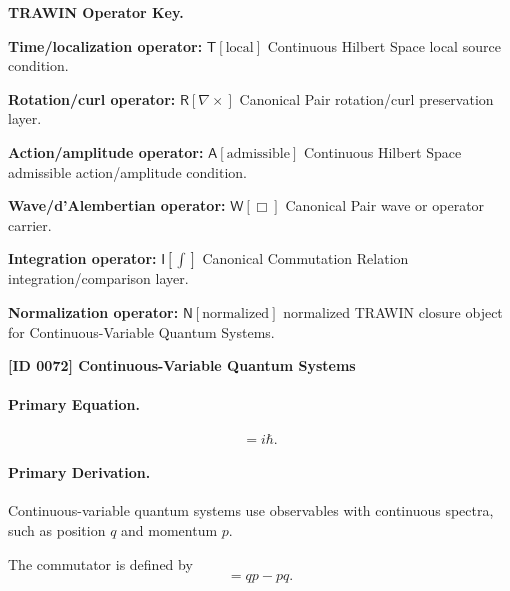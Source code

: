 \par\vspace{0.45\baselineskip}
\noindent\begin{minipage}[t]{\linewidth}
\begingroup
\small
\raggedright
\textbf{TRAWIN Operator Key.}\par
\noindent\textbf{Time/localization operator:} $\mathsf{T}\!\left[\mathrm{local}\right]$ Continuous Hilbert Space local source condition.\par
\noindent\textbf{Rotation/curl operator:} $\mathsf{R}\!\left[\nabla\times\right]$ Canonical Pair rotation/curl preservation layer.\par
\noindent\textbf{Action/amplitude operator:} $\mathsf{A}\!\left[\mathrm{admissible}\right]$ Continuous Hilbert Space admissible action/amplitude condition.\par
\noindent\textbf{Wave/d'Alembertian operator:} $\mathsf{W}\!\left[\Box\right]$ Canonical Pair wave or operator carrier.\par
\noindent\textbf{Integration operator:} $\mathsf{I}\!\left[\int\right]$ Canonical Commutation Relation integration/comparison layer.\par
\noindent\textbf{Normalization operator:} $\mathsf{N}\!\left[\mathrm{normalized}\right]$ normalized TRAWIN closure object for Continuous-Variable Quantum Systems.\par
\endgroup
\end{minipage}

\clearpage
\noindent\textbf{[ID 0072] Continuous-Variable Quantum Systems}\par
\vspace{0.35em}
\paragraph{Primary Equation.}
\begin{equation}
[q,p]=i\hbar .
\end{equation}

\paragraph{Primary Derivation.}
Continuous-variable quantum systems use observables with continuous spectra, such as position $q$ and momentum $p$.

The commutator is defined by
\begin{equation}
[q,p]=qp-pq .
\end{equation}

